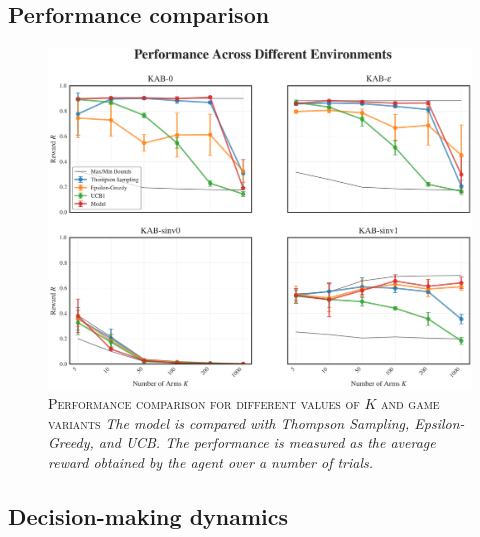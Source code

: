 \subsection{Performance comparison}

\begin{figure}[H]
    \centering
    \includegraphics[width=1.\textwidth]{figures/performance_plot.png}
    \caption{\textsc{Performance comparison for different values of $K$ and game variants} \textit{The model is compared with Thompson Sampling, Epsilon-Greedy, and UCB. The performance is measured as the average reward obtained by the agent over a number of trials.}}
    \label{fig:perf_plot}
\end{figure}


\subsection{Decision-making dynamics}

